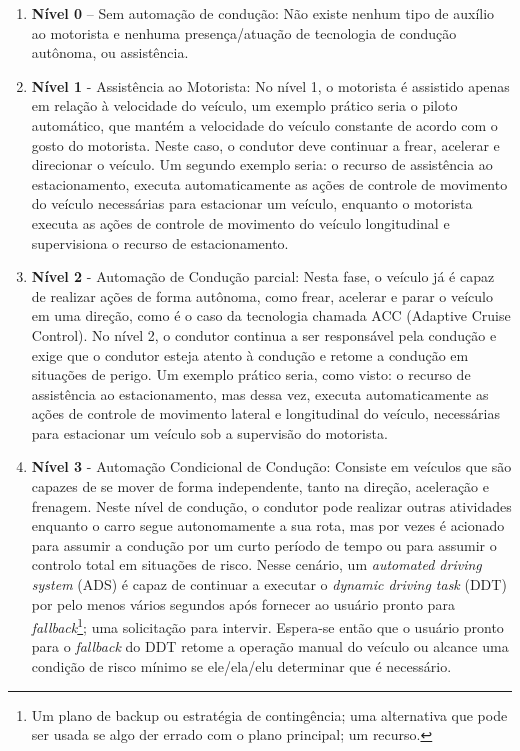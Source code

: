 \begin{enumerate} \label{SAE-level}
 \item \textbf{Nível 0} – Sem automação de condução: Não existe nenhum tipo de auxílio ao motorista e nenhuma presença/atuação de tecnologia de condução autônoma, ou assistência.

\item \textbf{Nível 1} - Assistência ao Motorista: No nível 1, o motorista é assistido apenas em relação à velocidade do veículo, um exemplo prático seria o piloto automático, que mantém a velocidade do veículo constante de acordo com o gosto do motorista. Neste caso, o condutor deve continuar a frear, acelerar e direcionar o veículo. Um segundo exemplo seria: o recurso de assistência ao estacionamento, executa automaticamente as ações de controle de movimento do veículo necessárias para estacionar um veículo, enquanto o motorista executa as ações de controle de movimento do veículo longitudinal e supervisiona o recurso de estacionamento.

\item \textbf{Nível 2} - Automação de Condução parcial: Nesta fase, o veículo já é capaz de realizar ações de forma autônoma, como frear, acelerar e parar o veículo em uma direção, como é o caso da tecnologia chamada ACC (Adaptive Cruise Control). No nível 2, o condutor continua a ser responsável pela condução e exige que o condutor esteja atento à condução e retome a condução em situações de perigo. Um exemplo prático seria, como visto: o recurso de assistência ao estacionamento, mas dessa vez, executa automaticamente as ações de controle de movimento lateral e longitudinal do veículo, necessárias para estacionar um veículo sob a supervisão do motorista.

\item \textbf{Nível 3} - Automação Condicional de Condução: Consiste em veículos que são capazes de se mover de forma independente, tanto na direção, aceleração e frenagem. Neste nível de condução, o condutor pode realizar outras atividades enquanto o carro segue autonomamente a sua rota, mas por vezes é acionado para assumir a condução por um curto período de tempo ou para assumir o controlo total em situações de risco. Nesse cenário, um \textit{automated driving system} (ADS)  é capaz de continuar a executar o \textit{dynamic driving task} (DDT) por pelo menos vários segundos após fornecer ao usuário pronto para \textit{fallback}\footnote{Um plano de backup ou estratégia de contingência; uma alternativa que pode ser usada se algo der errado com o plano principal; um recurso.}; uma solicitação para intervir. Espera-se então que o usuário pronto para o \textit{fallback} do DDT retome a operação manual do veículo ou alcance uma condição de risco mínimo se ele/ela/elu determinar que é necessário.


\end{enumerate}
